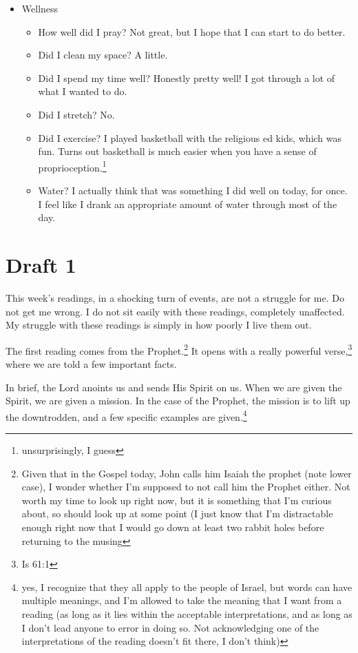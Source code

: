 \documentclass[12pt]{article}[titlepage]
\newcommand{\1}{\={a}}
\newcommand{\2}{\={e}}
\newcommand{\3}{\={\i}}
\newcommand{\4}{\=o}
\newcommand{\5}{\=u}
\newcommand{\6}{\={A}}
\renewcommand{\,}{\textsuperscript{,}}
\begin{document}
\begin{itemize}
\begin{itemize}
\end{itemize}
\item Wellness
\begin{itemize}
\item How well did I pray? Not great, but I hope that I can start to do better.
\item Did I clean my space? A little.
\item Did I spend my time well? Honestly pretty well! I got through a lot of what I wanted to do.
\item Did I stretch? No.
\item Did I exercise? I played basketball with the religious ed kids, which was fun. Turns out basketball is much easier when you have a sense of proprioception.\footnote{unsurprisingly, I guess}
\item Water? I actually think that was something I did well on today, for once. I feel like I drank an appropriate amount of water through most of the day.
\end{itemize}
\end{itemize}

\section{Draft 1}
This week's readings, in a shocking turn of events, are not a struggle for me.
Do not get me wrong.
I do not sit easily with these readings, completely unaffected.
My struggle with these readings is simply in how poorly I live them out.

The first reading comes from the Prophet.\footnote{Given that in the Gospel today, John calls him Isaiah the prophet (note lower case), I wonder whether I'm supposed to not call him the Prophet either.
Not worth my time to look up right now, but it is something that I'm curious about, so should look up at some point (I just know that I'm distractable enough right now that I would go down at least two rabbit holes before returning to the musing}
It opens with a really powerful verse,\footnote{Is 61:1} where we are told a few important facts.

In brief, the Lord anoints us and sends His Spirit on us.
When we are given the Spirit, we are given a mission.
In the case of the Prophet, the mission is to lift up the downtrodden, and a few specific examples are given.\footnote{yes, I recognize that they all apply to the people of Israel, but words can have multiple meanings, and I'm allowed to take the meaning that I want from a reading (as long as it lies within the acceptable interpretations, and as long as I don't lead anyone to error in doing so. Not acknowledging one of the interpretations of the reading doesn't fit there, I don't think)}
\end{document}
